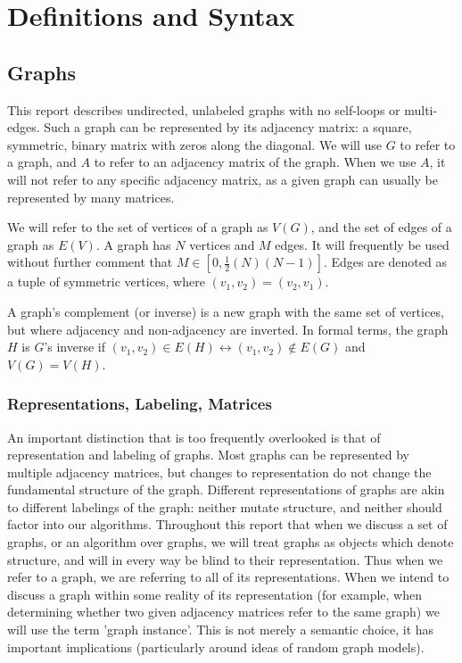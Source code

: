 \documentclass[11pt,a4paper]{report}
\begin{document}
\chapter{Definitions and Syntax}


\section{Graphs}
This report describes undirected, unlabeled graphs with no self-loops or multi-edges.
Such a graph can be represented by its adjacency matrix: a square, symmetric, binary matrix with zeros along the diagonal.
We will use $G$ to refer to a graph, and $A$ to refer to an adjacency matrix of the graph.
When we use $A$, it will not refer to any specific adjacency matrix, as a given graph can usually be represented by many matrices.

We will refer to the set of vertices of a graph as $V(G)$, and the set of edges of a graph as $E(V)$.
A graph has $N$ vertices and $M$ edges. 
It will frequently be used without further comment that $M \in [0, \frac{1}{2}(N)(N-1)]$.
Edges are denoted as a tuple of symmetric vertices, where $(v_1, v_2) = (v_2, v_1)$.

A graph's complement (or inverse) is a new graph with the same set of vertices, but where adjacency and non-adjacency are inverted.
In formal terms, the graph $H$ is $G$'s inverse if $(v_1, v_2) \in E(H) \leftrightarrow (v_1, v_2) \notin E(G)$ and $V(G) = V(H)$.

\subsection{Representations, Labeling, Matrices}
An important distinction that is too frequently overlooked is that of representation and labeling of graphs.
Most graphs can be represented by multiple adjacency matrices, but changes to representation do not change the fundamental structure of the graph.
Different representations of graphs are akin to different labelings of the graph: neither mutate structure, and neither should factor into our algorithms.
Throughout this report that when we discuss a set of graphs, or an algorithm over graphs, we will treat graphs as objects which denote structure, and will in every way be blind to their representation.
Thus when we refer to a graph, we are referring to all of its representations.
When we intend to discuss a graph within some reality of its representation (for example, when determining whether two given adjacency matrices refer to the same graph) we will use the term 'graph instance'.
This is not merely a semantic choice, it has important implications (particularly around ideas of random graph models).
\end{document}

